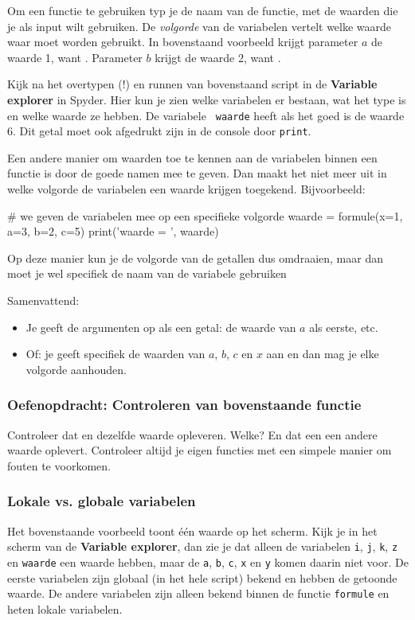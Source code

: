 \documentclass[a4paper,11pt, fleqn]{article}
\begin{document}
Om een functie te gebruiken typ je de naam van de functie, met de waarden die je als input wilt gebruiken. De \textit{volgorde} van de variabelen vertelt welke waarde waar moet worden gebruikt. 
In bovenstaand voorbeeld krijgt parameter $a$ de waarde 1, want . Parameter $b$ krijgt de waarde 2, want .

Kijk na het overtypen (!) en runnen van bovenstaand script in de \textbf{Variable explorer} in Spyder. Hier kun je zien welke variabelen er bestaan, wat het type is en welke waarde ze hebben. De variabele \verb, waarde, heeft als het goed is de waarde 6. Dit getal moet ook afgedrukt zijn in de console door \verb,print,.

Een andere manier om waarden toe te kennen aan de variabelen binnen een functie is door de goede namen mee te geven. Dan maakt het niet meer uit in welke volgorde de variabelen een waarde krijgen toegekend. Bijvoorbeeld:

\begin{python}
# we geven de variabelen mee op een specifieke volgorde
waarde = formule(x=1, a=3, b=2, c=5) 
print('waarde = ', waarde)
\end{python}

Op deze manier kun je de volgorde van de getallen dus omdraaien, maar dan moet je wel specifiek de naam van de variabele gebruiken

Samenvattend:
\begin{itemize}
\item Je geeft de argumenten op als een getal: de waarde van $a$ als eerste, etc.
\item Of: je geeft specifiek de waarden van $a$, $b$, $c$ en $x$ aan en dan mag je elke volgorde aanhouden.
\end{itemize}

\subsubsection*{Oefenopdracht: Controleren van bovenstaande functie}
Controleer dat  en   dezelfde waarde opleveren. Welke? En dat een  een andere waarde oplevert. Controleer altijd je eigen functies met een simpele manier om fouten te voorkomen.

\subsubsection{Lokale vs. globale variabelen}
Het bovenstaande voorbeeld toont \'e\'en waarde op het scherm. Kijk je in het scherm van de \textbf{Variable explorer}, dan zie je dat alleen de variabelen \verb.i., \verb.j., \verb.k., \verb.z. en \verb.waarde. een waarde hebben, maar de \verb.a., \verb.b., \verb.c., \verb.x. en \verb.y. komen daarin niet voor.
De eerste variabelen zijn globaal (in het hele script) bekend en hebben de getoonde waarde. De andere variabelen zijn alleen bekend binnen de functie \verb.formule. en heten lokale variabelen. 
\end{document}
